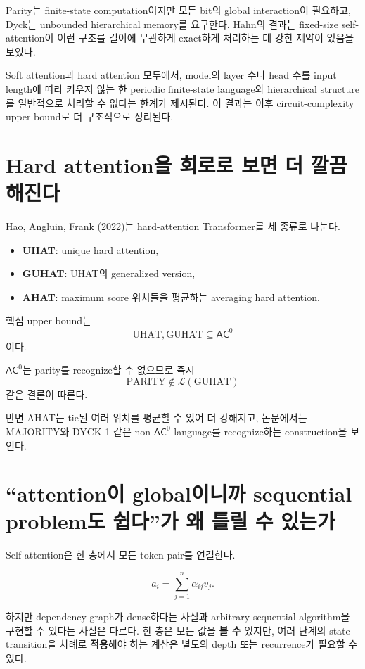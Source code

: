 \documentclass[11pt,a4paper,oneside,openany]{memoir}
\theoremstyle{definition}
\newcommand{\AC}{\mathsf{AC}}
\begin{document}
Parity는 finite-state computation이지만 모든 bit의 global interaction이 필요하고,
Dyck는 unbounded hierarchical memory를 요구한다. Hahn의 결과는 fixed-size self-attention이 이런 구조를 길이에 무관하게 exact하게 처리하는 데 강한 제약이 있음을 보였다.

\begin{paperbox}[--- Hahn (2020)]
Soft attention과 hard attention 모두에서, model의 layer 수나 head 수를 input length에 따라 키우지 않는 한 periodic finite-state language와 hierarchical structure를 일반적으로 처리할 수 없다는 한계가 제시된다. 이 결과는 이후 circuit-complexity upper bound로 더 구조적으로 정리된다.
\end{paperbox}

\section{Hard attention을 회로로 보면 더 깔끔해진다}

Hao, Angluin, Frank (2022)는 hard-attention Transformer를 세 종류로 나눈다.

\begin{itemize}
  \item \textbf{UHAT}: unique hard attention,
  \item \textbf{GUHAT}: UHAT의 generalized version,
  \item \textbf{AHAT}: maximum score 위치들을 평균하는 averaging hard attention.
\end{itemize}

핵심 upper bound는
\[
\boxed{\mathrm{UHAT},\mathrm{GUHAT}\subseteq \AC^0}
\]
이다.

$\AC^0$는 parity를 recognize할 수 없으므로 즉시
\[
\mathrm{PARITY}\notin \mathcal L(\mathrm{GUHAT})
\]
같은 결론이 따른다.

반면 AHAT는 tie된 여러 위치를 평균할 수 있어 더 강해지고, 논문에서는 MAJORITY와 DYCK-1 같은 non-$\AC^0$ language를 recognize하는 construction을 보인다.

\section{``attention이 global이니까 sequential problem도 쉽다''가 왜 틀릴 수 있는가}

Self-attention은 한 층에서 모든 token pair를 연결한다.

\[
a_i
=
\sum_{j=1}^{n}\alpha_{ij}v_j.
\]

하지만 dependency graph가 dense하다는 사실과 arbitrary sequential algorithm을 구현할 수 있다는 사실은 다르다.
한 층은 모든 값을 \textbf{볼 수} 있지만, 여러 단계의 state transition을 차례로 \textbf{적용}해야 하는 계산은 별도의 depth 또는 recurrence가 필요할 수 있다.
\end{document}
